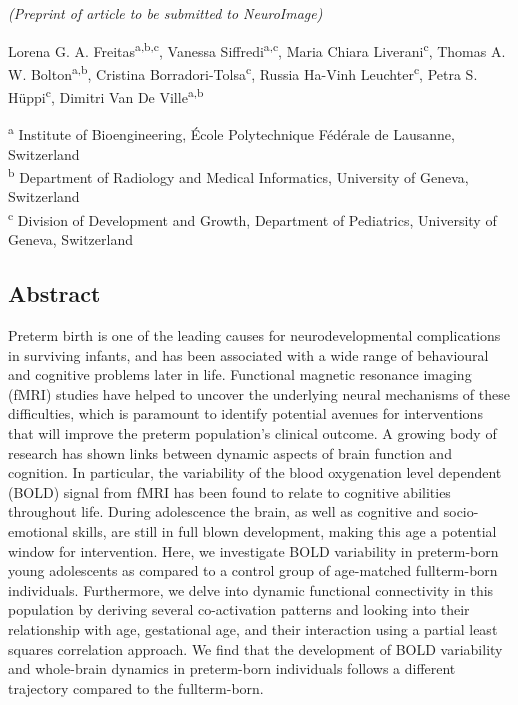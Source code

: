 \begin{center}
 \textit{(Preprint of article to be submitted to NeuroImage)}
 
Lorena G. A. Freitas\textsuperscript{a,b,c}, 
Vanessa Siffredi\textsuperscript{a,c}, 
Maria Chiara Liverani\textsuperscript{c}, 
Thomas A. W. Bolton\textsuperscript{a,b},
Cristina Borradori-Tolsa\textsuperscript{c}, 
Russia Ha-Vinh Leuchter\textsuperscript{c},
Petra S. Hüppi\textsuperscript{c},
Dimitri Van De Ville\textsuperscript{a,b}
\end{center}
\textsuperscript{a} Institute of Bioengineering, École Polytechnique Fédérale de Lausanne, Switzerland \\
\textsuperscript{b} Department of Radiology and Medical Informatics, University of Geneva, Switzerland \\
\textsuperscript{c} Division of Development and Growth, Department of Pediatrics, University of Geneva, Switzerland \\

\subsection*{Abstract}

Preterm birth is one of the leading causes for neurodevelopmental complications in surviving infants, and has been associated with a wide range of behavioural and cognitive problems later in life. Functional magnetic resonance imaging (fMRI) studies have helped to uncover the underlying neural mechanisms of these difficulties, which is paramount to identify potential avenues for interventions that will improve the preterm population's clinical outcome. A growing body of research has shown links between dynamic aspects of brain function and cognition. In particular, the variability of the blood oxygenation level dependent (BOLD) signal from fMRI has been found to relate to cognitive abilities throughout life. During adolescence the brain, as well as cognitive and socio-emotional skills, are still in full blown development, making this age a potential window for intervention. Here, we investigate BOLD variability in preterm-born young adolescents as compared to a control group of age-matched fullterm-born individuals. Furthermore, we delve into dynamic functional connectivity in this population by deriving several co-activation patterns and looking into their relationship with age, gestational age, and their interaction using a partial least squares correlation approach. We find that the development of BOLD variability and whole-brain dynamics in preterm-born individuals follows a different trajectory compared to the fullterm-born.


